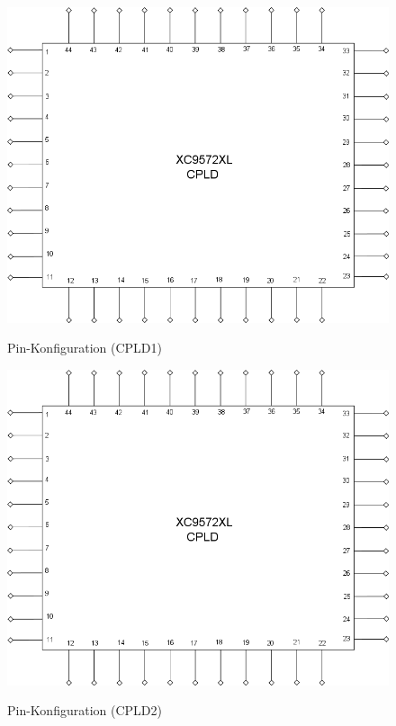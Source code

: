 \documentclass[a4paper,11pt]{article}
\begin{document}
		\begin{figure}[ht!]
		  \centering
		      \includegraphics[scale=0.48, angle=0]{PinDiagram.png}
			\label{fig:Pin1}
		  	\caption{Pin-Konfiguration (CPLD1)}
		\end{figure}

		\begin{figure}[ht!]
		  \centering
		      \includegraphics[scale=0.48, angle=0]{PinDiagram.png}
			\label{fig:Pin1}
		  	\caption{Pin-Konfiguration (CPLD2)}
		\end{figure}
\end{document}
